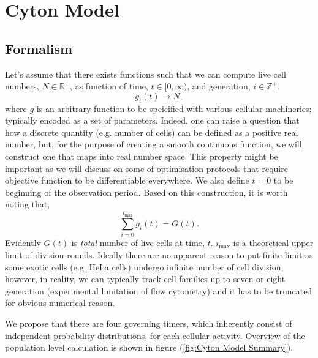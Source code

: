 \documentclass{article}
\newcommand{\enterProblemHeader}[1]{
    }
\newcommand{\exitProblemHeader}[1]{
    }
\newcounter{homeworkProblemCounter} %
\newcommand{\homeworkProblemName}{}
\newenvironment{homeworkProblem}[1][Problem \arabic{homeworkProblemCounter}]{ %
    \stepcounter{homeworkProblemCounter} %
    \renewcommand{\homeworkProblemName}{#1} %
    \section{\homeworkProblemName} %
    \enterProblemHeader{\homeworkProblemName} %
    }{
    \exitProblemHeader{\homeworkProblemName} %
    }
\begin{document}
    \clearpage
    \begin{homeworkProblem}[Cyton Model]
        \subsection{Formalism}
        Let's assume that there exists functions such that we can compute live cell numbers, $N \in \mathbb{R}^+$, as function of time, $t \in [0, \infty)$, and generation, $i \in \mathbb{Z}^+$.
        \begin{equation}
            g_i (t) \rightarrow N,
        \end{equation}
        where $g$ is an arbitrary function to be speicified with various cellular machineries; typically encoded as a set of parameters. Indeed, one can raise a question that how a discrete quantity (e.g. number of cells) can be defined as a positive real number, but, for the purpose of creating a smooth continuous function, we will construct one that maps into real number space. This property might be important as we will discuss on some of optimisation protocols that require objective function to be differentiable everywhere. We also define $t=0$ to be beginning of the observation period. Based on this construction, it is worth noting that,
        \begin{equation}
            \sum_{i=0}^{i_{\mathrm{max}}} g_i(t) = G(t).
        \end{equation}
        Evidently $G(t)$ is \textit{total} number of live cells at time, $t$. $i_{\mathrm{max}}$ is a theoretical upper limit of division rounds. Ideally there are no apparent reason to put finite limit as some exotic cells (e.g. HeLa cells) undergo infinite number of cell division, however, in reality, we can typically track cell families up to seven or eight generation (experimental limitation of flow cytometry) and it has to be truncated for obvious numerical reason.

        We propose that there are four governing timers, which inherently consist of independent probability distributions, for each cellular activity. Overview of the population level calculation is shown in figure (\ref{fig:Cyton Model Summary}).


\end{homeworkProblem}
\end{document}
